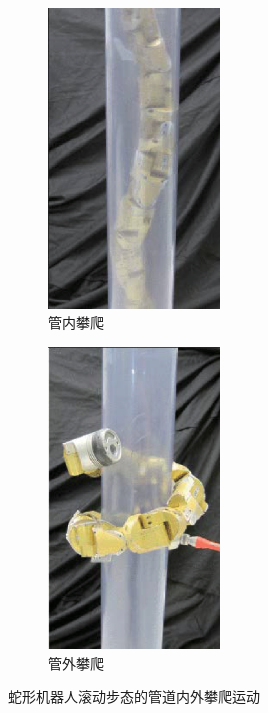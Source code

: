 \begin{figure}[h!] %
	\begin{subfigure}{0.5\textwidth}
		\centering
		\includegraphics[width=0.5\textwidth]{figure/chap03/pipecrawl.eps}
		\caption{管内攀爬}
		\label{fig:pipecrawl}
	\end{subfigure}
	\begin{subfigure}{0.5\textwidth}
		\centering
		\includegraphics[width=0.5\textwidth]{figure/chap03/poleclimb.eps}
		\caption{管外攀爬}
		\label{fig:poleclimb}
	\end{subfigure}
	\caption{蛇形机器人滚动步态的管道内外攀爬运动}
	\label{fig:polecc}
\end{figure}

